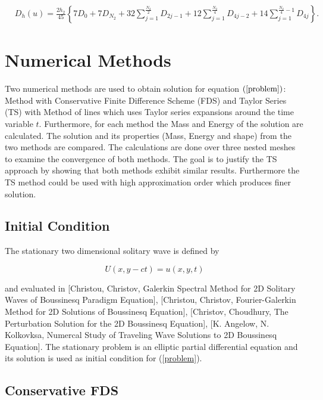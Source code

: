 \documentclass{article}
\newcommand{\rf}[1]{(\ref{#1})}
\begin{document}
\begin{align}\label{quadr6-2D}
&D_h(u) =
\frac{2h_2}{45} 
\left\{
7D_{0}+7D_{N_2}+32 \sum_{j=1}^{\frac{N_2}{2}}D_{2j-1}
+12\sum_{j=1}^{\frac{N_2}{4}}D_{4j-2}
+14 \sum_{j=1}^{\frac{N_2}{4}-1}D_{4j}
\right\}.
\end{align}

\section{Numerical Methods}

Two numerical methods are used to obtain solution for equation $\rf{problem}$: Method with Conservative Finite Difference Scheme (FDS) and Taylor Series (TS) with Method of lines which uses Taylor series expansions around the time variable $t$. Furthermore, for each method the Mass and Energy of the solution are calculated. The solution and its properties (Mass, Energy and shape) from the two methods are compared. The calculations are done over three nested meshes to examine the convergence of both methods. The goal is to justify the TS approach by showing that both methods exhibit similar results. Furthermore the TS method could be used with high approximation order which produces finer solution.

\subsection{ Initial Condition }
The stationary two dimensional solitary wave is defined by

$$U(x,y-ct) = u(x,y,t)$$

and evaluated in 
[Christou, Christov, Galerkin Spectral Method for 2D Solitary Waves of Boussinesq Paradigm Equation],
[Christou, Christov, Fourier-Galerkin Method for 2D Solutions of Boussinesq Equation],
[Christov, Choudhury, The Perturbation Solution for the 2D Boussinesq Equation],
[K. Angelow, N. Kolkovksa, Numercal Study of Traveling Wave Solutions to 2D Boussinesq Equation]. 
The stationary problem is an elliptic partial differential equation and its solution is used as initial condition for \rf{problem}.

\subsection{ Conservative FDS }
\end{document}
